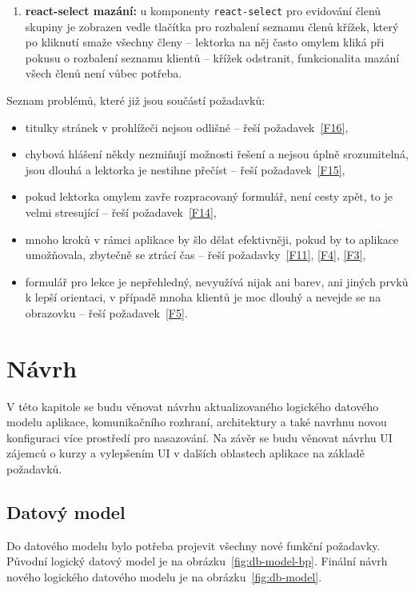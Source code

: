 \begin{enumerate}[label=\textbf{P\arabic*}]
    \item \label{P20} \textbf{react-select mazání:} u komponenty \verb|react-select| pro evidování členů skupiny je zobrazen vedle tlačítka pro rozbalení seznamu členů křížek, který po kliknutí smaže všechny členy -- lektorka na něj často omylem kliká při pokusu o rozbalení seznamu klientů -- křížek odstranit, funkcionalita mazání všech členů není vůbec potřeba.
\end{enumerate}

Seznam problémů, které již jsou součástí požadavků:
\begin{itemize}
    \item titulky stránek v prohlížeči nejsou odlišné -- řeší požadavek~\ref{F16},
    \item chybová hlášení někdy nezmiňují možnosti řešení a nejsou úplně srozumitelná, jsou dlouhá a lektorka je nestihne přečíst -- řeší požadavek~\ref{F15},
    \item pokud lektorka omylem zavře rozpracovaný formulář, není cesty zpět, to je velmi stresující -- řeší požadavek~\ref{F14},
    \item mnoho kroků v rámci aplikace by šlo dělat efektivněji, pokud by to aplikace umožňovala, zbytečně se ztrácí čas -- řeší požadavky~\ref{F11}, \ref{F4}, \ref{F3},
    \item formulář pro lekce je nepřehledný, nevyužívá nijak ani barev, ani jiných prvků k lepší orientaci, v případě mnoha klientů je moc dlouhý a nevejde se na obrazovku -- řeší požadavek~\ref{F5}.
\end{itemize}

\chapter{Návrh}\label{chap:navrh}

V této kapitole se budu věnovat návrhu aktualizovaného logického datového modelu aplikace, komunikačního rozhraní, architektury a také navrhnu novou konfiguraci více prostředí pro nasazování. Na závěr se budu věnovat návrhu UI zájemců o kurzy a vylepšením UI v dalších oblastech aplikace na základě požadavků.

\section{Datový model}\label{sec:datovymodel}

Do datového modelu bylo potřeba projevit všechny nové funkční požadavky. Původní logický datový model je na obrázku~\ref{fig:db-model-bp}. Finální návrh nového logického datového modelu je na obrázku~\ref{fig:db-model}.

